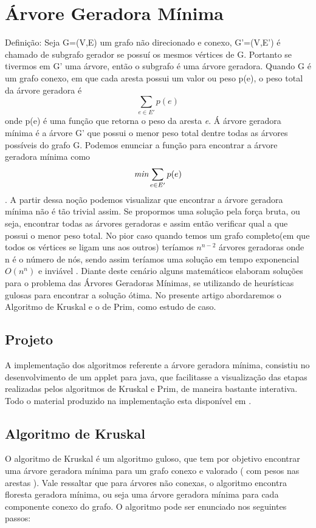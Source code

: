 \documentclass[a4paper,12pt]{article}
\begin{document}
\newpage
\section{Árvore Geradora Mínima}
Definição: Seja G=(V,E) um grafo não direcionado e conexo, G'=(V,E') é chamado de subgrafo gerador se possuí os mesmos vértices de G. Portanto se tivermos em G' uma árvore, então o subgrafo é uma árvore geradora. 
Quando G é um grafo conexo, em que cada aresta possui um valor ou peso p(e), o peso total da árvore geradora é \[\sum_{e \in E'}p(e)\] onde p(e) é uma função que retorna o peso da aresta \emph{e}. Á árvore geradora mínima é a árvore G' que possui o menor peso total dentre todas as árvores possíveis do grafo G\cite{nogueira}. Podemos enunciar a função para encontrar a árvore geradora mínima como \[\emph{min}\sum_{e\in E'}p(e)\].
A partir dessa noção podemos visualizar que encontrar a árvore geradora mínima não é tão trivial assim. Se propormos uma solução pela força bruta, ou seja, encontrar todas as árvores geradoras e assim então verificar qual a que possui o menor peso total. No pior caso quando temos um grafo completo(em que todos os vértices se ligam uns aos outros) teríamos $n^{n-2}$ árvores geradoras onde n é o número de nós, sendo assim teríamos uma solução em tempo exponencial $O(n^n)$ e inviável \cite{unicamp}.
Diante deste cenário alguns matemáticos elaboram soluções para o problema das Árvores Geradoras Mínimas, se utilizando de heurísticas gulosas para encontrar a solução ótima. No presente artigo abordaremos o Algoritmo de Kruskal e o de Prim, como estudo de caso.

\subsection{Projeto}
A implementação dos algoritmos referente a árvore geradora mínima, consistiu no desenvolvimento de um applet para java, que facilitasse a visualização das etapas realizadas pelos algoritmos de Kruskal e Prim, de maneira bastante interativa. Todo o material produzido na implementação esta disponível em \cite{niltonvasques}.

\subsection{Algoritmo de Kruskal}
O algoritmo de Kruskal é um algoritmo guloso, que tem por objetivo encontrar uma árvore geradora mínima para um grafo conexo e valorado ( com pesos nas arestas ). Vale ressaltar que para árvores não conexas, o algoritmo encontra floresta geradora mínima, ou seja uma árvore geradora mínima para cada componente conexo do grafo. O algoritmo pode ser enunciado nos seguintes passos:
\end{document}
